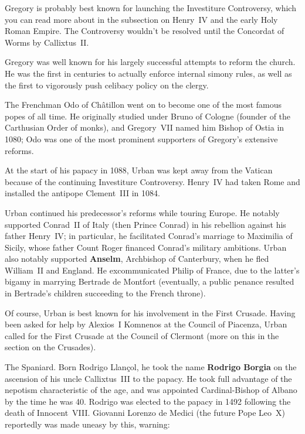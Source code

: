 Gregory is probably best known for launching the Investiture Controversy,
which you can read more about in the subsection on Henry~IV and the early Holy Roman Empire.
The Controversy wouldn't be resolved until the Concordat of Worms by Callixtus~II\@.

Gregory was well known for his largely successful attempts to reform the church.
He was the first in centuries to actually enforce internal simony rules,
as well as the first to vigorously push celibacy policy on the clergy.


The Frenchman Odo of Ch\^atillon went on to become one of the most famous popes of all time.
He originally studied under Bruno of Cologne (founder of the Carthusian Order of monks),
and Gregory~VII named him Bishop of Ostia in 1080;
Odo was one of the most prominent supporters of Gregory's extensive reforms.

At the start of his papacy in 1088,
Urban was kept away from the Vatican because of the continuing Investiture Controversy.
Henry~IV had taken Rome and installed the antipope Clement~III in 1084.

Urban continued his predecessor's reforms while touring Europe.
He notably supported Conrad~II of Italy (then Prince Conrad)
in his rebellion against his father Henry~IV\@;
in particular, he facilitated Conrad's marriage to Maximilia of Sicily,
whose father Count Roger financed Conrad's military ambitions.
Urban also notably supported \textbf{Anselm}, Archbishop of Canterbury,
when he fled William~II and England.
He excommunicated Philip of France, due to the latter's bigamy in marrying Bertrade de Montfort
(eventually, a public penance resulted in Bertrade's children succeeding to the French throne).

Of course, Urban is best known for his involvement in the First Crusade.
Having been asked for help by Alexios~I Komnenos at the Council of Piacenza,
Urban called for the First Crusade at the Council of Clermont
(more on this in the section on the Crusades).


The Spaniard.
Born Rodrigo Llan\c{c}ol,
he took the name \textbf{Rodrigo Borgia} on the ascension of his uncle Callixtus~III to the papacy.
He took full advantage of the nepotism characteristic of the age,
and was appointed Cardinal-Bishop of Albano by the time he was 40.
Rodrigo was elected to the papacy in 1492 following the death of Innocent~VIII\@.
Giovanni Lorenzo de Medici (the future Pope Leo~X) reportedly was made uneasy by this, warning:

